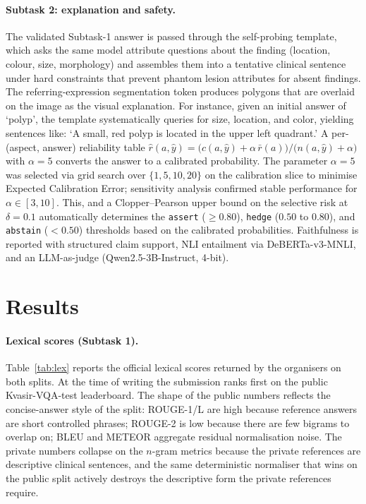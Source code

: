 \documentclass{ceurart}
\begin{document}
\paragraph{Subtask 2: explanation and safety.}
The validated Subtask-1 answer is passed through the self-probing
template, which asks the same model attribute questions about the
finding (location, colour, size, morphology) and assembles them into
a tentative clinical sentence under hard constraints that prevent
phantom lesion attributes for absent findings. The referring-expression
segmentation token produces polygons that are overlaid on the image
as the visual explanation. For instance, given an initial answer of `polyp', the template systematically queries for size, location, and color, yielding sentences like: `A small, red polyp is located in the upper left quadrant.' A per-(aspect, answer) reliability table
$\hat r(a,\hat y)=\big(c(a,\hat y)+\alpha\,\bar r(a)\big)\big/\big(n(a,\hat y)+\alpha\big)$
with $\alpha=5$ converts the answer to a calibrated probability. The parameter $\alpha=5$ was selected via grid search over $\{1, 5, 10, 20\}$ on the calibration slice to minimise Expected Calibration Error; sensitivity analysis confirmed stable performance for $\alpha \in [3, 10]$. This, and
a Clopper--Pearson upper bound on the selective risk at $\delta=0.1$
\cite{angelopoulos2023conformal,bates2021distribution} automatically determines the
\texttt{assert} ($\ge 0.80$), \texttt{hedge} ($0.50$ to $0.80$), and \texttt{abstain} ($< 0.50$) thresholds based on the calibrated probabilities. Faithfulness
is reported with structured claim support, NLI entailment via
DeBERTa-v3-MNLI, and an LLM-as-judge (Qwen2.5-3B-Instruct, 4-bit).

\section{Results}\label{sec:results}

\paragraph{Lexical scores (Subtask 1).}
Table~\ref{tab:lex} reports the official lexical scores returned by
the organisers on both splits. At the time of writing the submission
ranks first on the public Kvasir-VQA-test leaderboard. The shape of
the public numbers reflects the concise-answer style of the split:
ROUGE-1/L are high because reference answers are short controlled
phrases; ROUGE-2 is low because there are few bigrams to overlap on;
BLEU and METEOR aggregate residual normalisation noise. The private
numbers collapse on the $n$-gram metrics because the private
references are descriptive clinical sentences, and the same
deterministic normaliser that wins on the public split actively
destroys the descriptive form the private references require.
\end{document}
